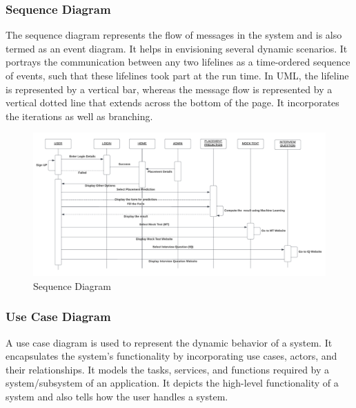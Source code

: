 \documentclass[12pt]{article}
\begin{document}
\subsubsection{Sequence Diagram}

The sequence diagram represents the flow of messages in the system and is also termed as an event diagram. It helps in envisioning several dynamic scenarios. It portrays the communication between any two lifelines as a time-ordered sequence of events, such that these lifelines took part at the run time. In UML, the lifeline is represented by a vertical bar, whereas the message flow is represented by a vertical dotted line that extends across the bottom of the page. It incorporates the iterations as well as branching.

\begin{figure}[H]
\begin{center}
\includegraphics[scale=.6]{Sequence diagram}
\caption{Sequence Diagram}
\end{center}
\end{figure}

\subsubsection{Use Case Diagram}

A use case diagram is used to represent the dynamic behavior of a system. It encapsulates the system's functionality by incorporating use cases, actors, and their relationships. It models the tasks, services, and functions required by a system/subsystem of an application. It depicts the high-level functionality of a system and also tells how the user handles a system.
\end{document}
